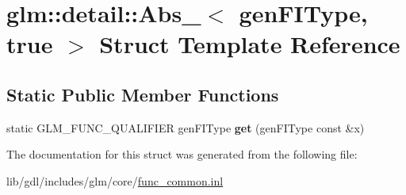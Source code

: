 \hypertarget{structglm_1_1detail_1_1_abs___3_01gen_f_i_type_00_01true_01_4}{}\section{glm\+:\+:detail\+:\+:Abs\+\_\+$<$ gen\+F\+I\+Type, true $>$ Struct Template Reference}
\label{structglm_1_1detail_1_1_abs___3_01gen_f_i_type_00_01true_01_4}
\subsection*{Static Public Member Functions}
\begin{DoxyCompactItemize}
\item 
\hypertarget{structglm_1_1detail_1_1_abs___3_01gen_f_i_type_00_01true_01_4_aafc8462318c46325bfa049fdb0315b67}{}static G\+L\+M\+\_\+\+F\+U\+N\+C\+\_\+\+Q\+U\+A\+L\+I\+F\+I\+E\+R gen\+F\+I\+Type {\bfseries get} (gen\+F\+I\+Type const \&x)\label{structglm_1_1detail_1_1_abs___3_01gen_f_i_type_00_01true_01_4_aafc8462318c46325bfa049fdb0315b67}

\end{DoxyCompactItemize}


The documentation for this struct was generated from the following file\+:\begin{DoxyCompactItemize}
\item 
lib/gdl/includes/glm/core/\hyperlink{func__common_8inl}{func\+\_\+common.\+inl}\end{DoxyCompactItemize}
